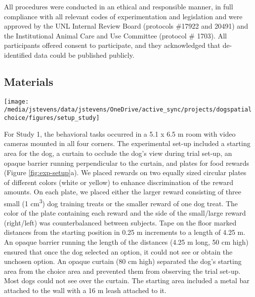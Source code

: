 \documentclass[
  pub,floatsintext]{apa6}
\begin{document}
All procedures were conducted in an ethical and responsible manner, in full compliance with all relevant codes of experimentation and legislation and were approved by the UNL Internal Review Board (protocols \#17922 and 20491) and the Institutional Animal Care and Use Committee (protocol \# 1703). All participants offered consent to participate, and they acknowledged that de-identified data could be published publicly.

\hypertarget{materials}{%
\subsection{Materials}\label{materials}}

\begin{figure*}

{\centering \texttt{[image: /media/jstevens/data/jstevens/OneDrive/active\_sync/projects/dogspatialchoice/figures/setup\_study]} 

}

\caption{Experimental set-up. (a) For Study 1, the illustration shows the entire room size.  (b) Study 2 was conducted in a much larger room, so only one wall (bottom) is illustrated. Dog figure from \href{https://vecteezy.com}{vecteezy.com} and experimenter figures adapted from art by \href{https://www.freepik.com/macrovector}{macrovector} on \href{https://www.freepik.com/free-vector/professions-top-view-colored-icons-set_3997920.htm}{freepik.com}.}\label{fig:exp-setup}
\end{figure*}

For Study 1, the behavioral tasks occurred in a 5.1 x 6.5 m room with video cameras mounted in all four corners. The experimental set-up included a starting area for the dog, a curtain to occlude the dog's view during trial set-up, an opaque barrier running perpendicular to the curtain, and plates for food rewards (Figure \ref{fig:exp-setup}a). We placed rewards on two equally sized circular plates of different colors (white or yellow) to enhance discrimination of the reward amounts. On each plate, we placed either the larger reward consisting of three small (1 cm\textsuperscript{3}) dog training treats or the smaller reward of one dog treat. The color of the plate containing each reward and the side of the small/large reward (right/left) was counterbalanced between subjects. Tape on the floor marked distances from the starting position in 0.25 m increments to a length of 4.25 m. An opaque barrier running the length of the distances (4.25 m long, 50 cm high) ensured that once the dog selected an option, it could not see or obtain the unchosen option. An opaque curtain (80 cm high) separated the dog's starting area from the choice area and prevented them from observing the trial set-up. Most dogs could not see over the curtain. The starting area included a metal bar attached to the wall with a 16 m leash attached to it.
\end{document}
